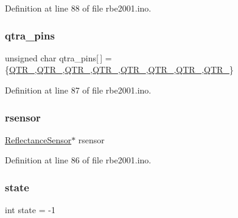 Definition at line 88 of file rbe2001.\+ino.

\mbox{\label{rbe2001_8ino_a5b4fcadc7c7d5da32f396d144180a048}} 
\subsubsection{\texorpdfstring{qtra\+\_\+pins}{qtra\_pins}}
{\footnotesize\ttfamily unsigned char qtra\+\_\+pins\mbox{[}$\,$\mbox{]} = \{\hyperlink{config_8h_a78fa539ebb20148cbfcad00742561cf6}{Q\+T\+R\+\_},\hyperlink{config_8h_a49fbc5f0ba729444355eb9ce3588aa40}{Q\+T\+R\+\_},\hyperlink{config_8h_ae5dcb2e48b67f90a48eddc8d7f1b44ea}{Q\+T\+R\+\_},\hyperlink{config_8h_a1e52ef437d8700013af2088d388a1cf3}{Q\+T\+R\+\_},\hyperlink{config_8h_ad90df5df0b2368d826186652cfbe236a}{Q\+T\+R\+\_},\hyperlink{config_8h_ab683ec86911bbd120c0623b121046420}{Q\+T\+R\+\_},\hyperlink{config_8h_a5b8ce3aa53de77253e04c5d0eecf97db}{Q\+T\+R\+\_},\hyperlink{config_8h_a6eef11bb690916992e7933e0ae8e2047}{Q\+T\+R\+\_}\}}



Definition at line 87 of file rbe2001.\+ino.

\mbox{\label{rbe2001_8ino_aec14d311939d778664c04e32ca91a864}} 
\subsubsection{\texorpdfstring{rsensor}{rsensor}}
{\footnotesize\ttfamily \hyperlink{class_reflectance_sensor}{Reflectance\+Sensor}$\ast$ rsensor}



Definition at line 86 of file rbe2001.\+ino.

\mbox{\label{rbe2001_8ino_a89f234133d3efe315836311cbf21c64b}} 
\subsubsection{\texorpdfstring{state}{state}}
{\footnotesize\ttfamily int state = -\/1}



